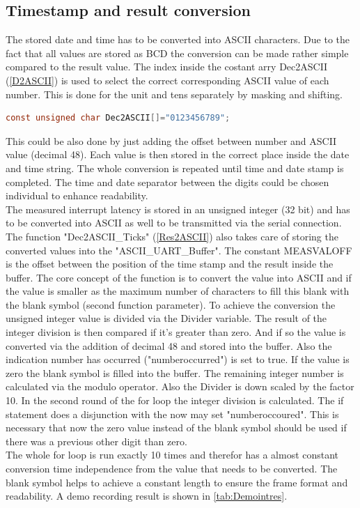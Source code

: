 \subsection{Timestamp and result conversion}
The stored date and time has to be converted into ASCII characters. Due to the fact that all values are stored as \ac{BCD} the conversion can be made rather simple  compared to the result value. The index inside the costant arry Dec2ASCII (\autoref{D2ASCII}) is used to select the correct corresponding ASCII value of each number. This is done for the unit and tens separately by masking and shifting.\\
\begin{lstlisting}[language=C,caption={Constant Dec2ASCII},label={D2ASCII}]
const unsigned char Dec2ASCII[]="0123456789";
\end{lstlisting}
This could be also done by just adding the offset between number and ASCII value (decimal 48). Each value is then stored in the correct place inside the date and time string. The whole conversion is repeated until time and date stamp is completed. The time and date separator between the digits could be chosen individual to enhance readability.\\ 
The measured interrupt latency is stored in an unsigned integer (32 bit) and has to be converted into ASCII as well to be transmitted via the serial connection. The function "Dec2ASCII\_Ticks" (\autoref{Res2ASCII}) also takes care of storing the converted values into the "ASCII\_UART\_Buffer". The constant MEASVALOFF is the offset between the position of the time stamp and the result inside the buffer. The core concept of the function is to convert the value into ASCII and if the value is smaller as the maximum number of characters to fill this blank with the blank symbol (second function parameter). To achieve the conversion the unsigned integer value is divided via the Divider variable. The result of the integer division is then compared if it's greater than zero. And if so the value is converted via the addition of decimal 48 and stored into the buffer. Also the indication number has occurred ("numberoccurred") is set to true. If the value is zero the blank symbol is filled into the buffer. The remaining integer number is calculated via the modulo operator. Also the Divider is down scaled by the factor 10. In the second round of the for loop the integer division is calculated. The if statement does a disjunction with the now may set "numberoccoured". This is necessary that now the zero value instead of the blank symbol should be used if there was a previous other digit than zero.\\
The whole for loop is run exactly 10 times and therefor has a almost constant conversion time independence from the value that needs to be converted. The blank symbol helps to achieve a constant length to ensure the frame format and readability. A demo recording result  is shown in \autoref{tab:Demointres}.\\

